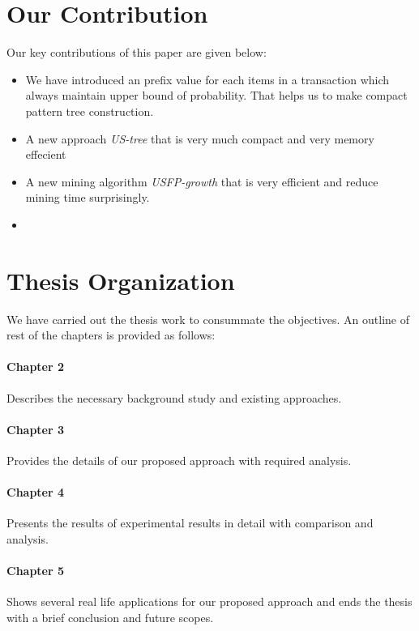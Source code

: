 \section{Our Contribution}
Our key contributions of this paper are given below:
\begin{itemize}
\item We have introduced an prefix value for each items in a transaction which always maintain upper bound of probability. That helps us to make compact pattern tree construction.
\item A new approach \emph{US-tree} that is very much compact and very memory effecient
\item A new mining algorithm \emph{USFP-growth} that is very efficient and reduce mining time surprisingly.
\item 
\end{itemize}


\section{Thesis Organization}
We have carried out the thesis work to consummate the objectives. An outline of rest of the chapters is provided as follows:
\paragraph{Chapter 2}
Describes the necessary background study and existing approaches.
\paragraph{Chapter 3}
Provides the details of our proposed approach with required analysis.
\paragraph{Chapter 4}
Presents the results of experimental results in detail with comparison and analysis.
\paragraph{Chapter 5}
Shows several real life applications for our proposed approach and ends the thesis with a brief conclusion and future scopes.
%